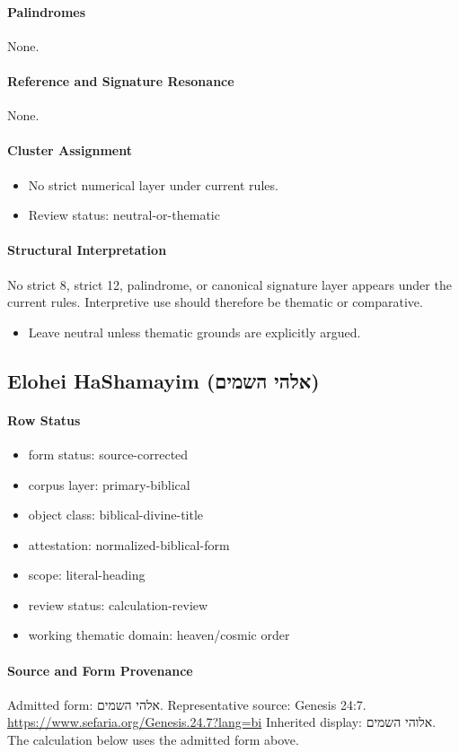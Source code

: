 \paragraph{Palindromes}
None.
\paragraph{Reference and Signature Resonance}
None.
\paragraph{Cluster Assignment}
\begin{itemize}
\item No strict numerical layer under current rules.
\item Review status: neutral-or-thematic
\end{itemize}
\paragraph{Structural Interpretation}
No strict 8, strict 12, palindrome, or canonical signature layer appears under the current rules. Interpretive use should therefore be thematic or comparative.

\begin{itemize}
\item Leave neutral unless thematic grounds are explicitly argued.
\end{itemize}

\subsection{Elohei HaShamayim (אלהי השמים)}
\paragraph{Row Status}
\begin{itemize}
\item form status: source-corrected
\item corpus layer: primary-biblical
\item object class: biblical-divine-title
\item attestation: normalized-biblical-form
\item scope: literal-heading
\item review status: calculation-review
\item working thematic domain: heaven/cosmic order
\end{itemize}
\paragraph{Source and Form Provenance}
Admitted form: אלהי השמים.
Representative source: Genesis 24:7.
\url{https://www.sefaria.org/Genesis.24.7?lang=bi}
Inherited display: אלוהי השמים. The calculation below uses the admitted form above.
